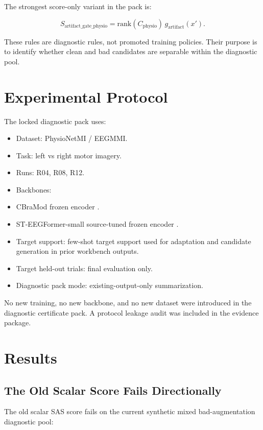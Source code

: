 \documentclass[11pt]{article}
\begin{document}
The strongest score-only variant in the pack is:

\[
S_{\mathrm{artifact\_gate\_physio}} =
\mathrm{rank}(C_{\mathrm{physio}})\,g_{\mathrm{artifact}}(x').
\]

These rules are diagnostic rules, not promoted training policies. Their purpose is to identify whether clean and bad candidates are separable within the diagnostic pool.

\section{Experimental Protocol}

The locked diagnostic pack uses:

\begin{itemize}
\item Dataset: PhysioNetMI / EEGMMI.
\item Task: left vs right motor imagery.
\item Runs: R04, R08, R12.
\item Backbones:
\item CBraMod frozen encoder \cite{Wang2025CBraMod}.
\item ST-EEGFormer-small source-tuned frozen encoder \cite{Yang2026STEEGFormer}.
\item Target support: few-shot target support used for adaptation and candidate generation in prior workbench outputs.
\item Target held-out trials: final evaluation only.
\item Diagnostic pack mode: existing-output-only summarization.
\end{itemize}

No new training, no new backbone, and no new dataset were introduced in the diagnostic certificate pack. A protocol leakage audit was included in the evidence package.

\section{Results}

\subsection{The Old Scalar Score Fails Directionally}

The old scalar SAS score fails on the current synthetic mixed bad-augmentation diagnostic pool:


\end{document}
